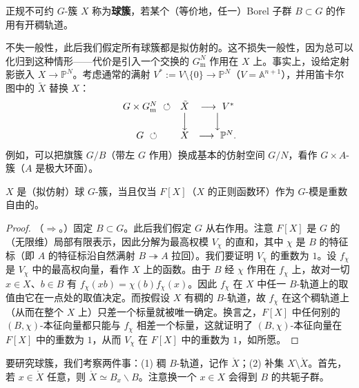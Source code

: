 \begin{defn}
  正规不可约 $G$-簇 $X$ 称为\textbf{球簇}，若某个（等价地，任一）Borel 子群 $B\subset G$ 的作用有开稠轨道。
\end{defn}

不失一般性，此后我们假定所有球簇都是拟仿射的。这不损失一般性，因为总可以化归到这种情形——代价是引入一个交换的 $G_{\mathrm m}^N$ 作用在 $X$ 上。事实上，设给定射影嵌入 $X\to\mathbb P^N$。考虑通常的满射 $V^*:=V\setminus\{0\}\to\mathbb P^N$（$V=\mathbb A^{n+1}$），并用笛卡尔图中的 $\tilde X$ 替换 $X$：
\[
  \begin{array}{ccc}
    G\times G_{\mathrm m}^N\ \circlearrowleft & \tilde X & \longrightarrow\ V^*\\
    & \Big\downarrow & \Big\downarrow\\
    G\ \circlearrowleft & X & \longrightarrow\ \mathbb P^N.
  \end{array}
\]
例如，可以把旗簇 $G/B$（带左 $G$ 作用）换成基本的仿射空间 $G/N$，看作 $G\times A$-簇（$A$ 是极大环面）。

\begin{thm}
  $X$ 是（拟仿射）球 $G$-簇，当且仅当 $F[X]$（$X$ 的正则函数环）作为 $G$-模是重数自由的。
\end{thm}
\begin{proof}
  （$\Rightarrow$。）固定 $B\subset G$。此后我们假定 $G$ 从右作用。注意 $F[X]$ 是 $G$ 的（无限维）局部有限表示，因此分解为最高权模 $V_\chi$ 的直和，其中 $\chi$ 是 $B$ 的特征标（即 $A$ 的特征标沿自然满射 $B\twoheadrightarrow A$ 拉回）。我们要证明 $V_\chi$ 的重数为 $1$。设 $f_\chi$ 是 $V_\chi$ 中的最高权向量，看作 $X$ 上的函数。由于 $B$ 经 $\chi$ 作用在 $f_\chi$ 上，故对一切 $x\in X$、$b\in B$ 有 $f_\chi(xb)=\chi(b)f_\chi(x)$。因此 $f_\chi$ 在 $X$ 中任一 $B$-轨道上的取值由它在一点处的取值决定。而按假设 $X$ 有稠的 $B$-轨道，故 $f_\chi$ 在这个稠轨道上（从而在整个 $X$ 上）只差一个标量就被唯一确定。换言之，$F[X]$ 中任何别的 $(B,\chi)$-本征向量都只能与 $f_\chi$ 相差一个标量，这就证明了 $(B,\chi)$-本征向量在 $F[X]$ 中的重数为 $1$，从而 $V_\chi$ 在 $F[X]$ 中的重数为 $1$，如所愿。
\end{proof}

要研究球簇，我们考察两件事：(1) 稠 $B$-轨道，记作 $\mathring X$；(2) 补集 $X\setminus\mathring X$。首先，若 $x\in\mathring X$ 任意，则 $\mathring X\simeq B_x\backslash B$。注意换一个 $x\in X$ 会得到 $B$ 的共轭子群。

